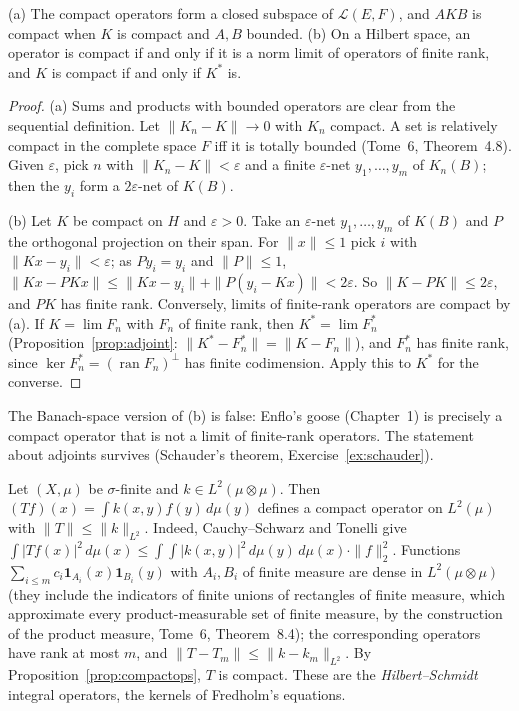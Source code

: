 \begin{proposition}\label{prop:compactops}
(a) The compact operators form a closed subspace of $\mathcal L(E,F)$, and $AKB$ is compact when $K$ is compact and $A,B$ bounded. (b) On a Hilbert space, an operator is compact if and only if it is a norm limit of operators of finite rank, and
$K$ is compact if and only if $K^*$ is.
\end{proposition}
\begin{proof}
(a) Sums and products with bounded operators are clear from the sequential definition. Let $\|K_n-K\|\to0$ with $K_n$ compact. A set is relatively compact in the complete space $F$ iff it is totally bounded (Tome~6, Theorem~4.8). Given
$\varepsilon$, pick $n$ with $\|K_n-K\|<\varepsilon$ and a finite $\varepsilon$-net $y_1,\dots,y_m$ of $K_n(B)$; then the $y_i$ form a $2\varepsilon$-net of $K(B)$.

(b) Let $K$ be compact on $H$ and $\varepsilon>0$. Take an $\varepsilon$-net $y_1,\dots,y_m$ of $K(B)$ and $P$ the orthogonal projection on their span. For $\|x\|\le1$ pick $i$ with $\|Kx-y_i\|<\varepsilon$; as $Py_i=y_i$ and $\|P\|\le1$,
$\|Kx-PKx\|\le\|Kx-y_i\|+\|P(y_i-Kx)\|<2\varepsilon$. So $\|K-PK\|\le2\varepsilon$, and $PK$ has finite rank. Conversely, limits of finite-rank operators are compact by (a). If $K=\lim F_n$ with $F_n$ of finite rank, then
$K^*=\lim F_n^*$ (Proposition~\ref{prop:adjoint}: $\|K^*-F_n^*\|=\|K-F_n\|$), and $F_n^*$ has finite rank, since $\ker F_n^*=(\operatorname{ran}F_n)^\perp$ has finite codimension. Apply this to $K^*$ for the converse.
\end{proof}

The Banach-space version of (b) is false: Enflo's goose (Chapter~1) is precisely a compact operator that is not a limit of finite-rank operators. The statement about adjoints survives (Schauder's theorem, Exercise~\ref{ex:schauder}).

\begin{example}\label{ex:hilbertschmidt}
Let $(X,\mu)$ be $\sigma$-finite and $k\in L^2(\mu\otimes\mu)$. Then $(Tf)(x)=\int k(x,y)f(y)\,d\mu(y)$ defines a compact operator on $L^2(\mu)$ with $\|T\|\le\|k\|_{L^2}$. Indeed, Cauchy--Schwarz and Tonelli give
$\int|Tf(x)|^2\,d\mu(x)\le\int\!\!\int|k(x,y)|^2\,d\mu(y)\,d\mu(x)\cdot\|f\|_2^2$. Functions $\sum_{i\le m}c_i\mathbf 1_{A_i}(x)\mathbf 1_{B_i}(y)$ with $A_i,B_i$ of finite measure are dense in $L^2(\mu\otimes\mu)$ (they include the indicators of
finite unions of rectangles of finite measure, which approximate every product-measurable set of finite measure, by the construction of the product measure, Tome~6, Theorem~8.4); the corresponding operators have rank at most
$m$, and $\|T-T_m\|\le\|k-k_m\|_{L^2}$. By Proposition~\ref{prop:compactops}, $T$ is compact. These are the \emph{Hilbert--Schmidt} integral operators, the kernels of Fredholm's equations.
\end{example}


